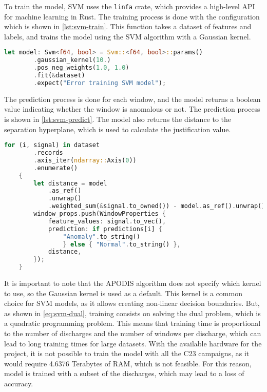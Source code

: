 To train the model, SVM uses the \texttt{linfa} crate, which provides a high-level API for machine learning in Rust. The training process is done with the configuration which is shown in \autoref{lst:svm-train}. This function takes a dataset of features and labels, and trains the model using the \ac{SVM} algorithm with a Gaussian kernel.

\begin{lstlisting}[language=Rust, caption={Training the \ac{SVM} model}, label={lst:svm-train}]
    let model: Svm<f64, bool> = Svm::<f64, bool>::params()
        .gaussian_kernel(10.)
        .pos_neg_weights(1.0, 1.0)
        .fit(&dataset)
        .expect("Error training SVM model");
\end{lstlisting}

The prediction process is done for each window, and the model returns a boolean value indicating whether the window is anomalous or not. The prediction process is shown in \autoref{lst:svm-predict}. The model also returns the distance to the separation hyperplane, which is used to calculate the justification value.

\begin{lstlisting}[language=Rust, caption={Prediction with the \ac{SVM} model}, label={lst:svm-predict}]
    for (i, signal) in dataset
        .records
        .axis_iter(ndarray::Axis(0))
        .enumerate() 
    {
        let distance = model
            .as_ref()
            .unwrap()
            .weighted_sum(&signal.to_owned()) - model.as_ref().unwrap().rho;
        window_props.push(WindowProperties {
            feature_values: signal.to_vec(),
            prediction: if predictions[i] { 
                "Anomaly".to_string() 
                } else { "Normal".to_string() },
            distance,
        });
    }
\end{lstlisting}

It is important to note that the \ac{APODIS} algorithm does not specify which kernel to use, so the Gaussian kernel is used as a default. This kernel is a common choice for \ac{SVM} models, as it allows creating non-linear decision boundaries. But, as shown in \autoref{eq:svm-dual}, training consists on solving the dual problem, which is a quadratic programming problem. This means that training time is proportional to the number of discharges and the number of windows per discharge, which can lead to long training times for large datasets. With the available hardware for the project, it is not possible to train the model with all the C23 campaigns, as it would require 4.6376 Terabytes of RAM, which is not feasible. For this reason, model is trained with a subset of the discharges, which may lead to a loss of accuracy.

